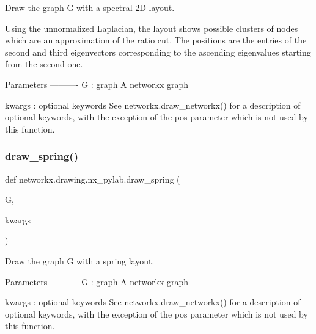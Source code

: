 \begin{DoxyVerb}Draw the graph G with a spectral 2D layout.

Using the unnormalized Laplacian, the layout shows possible clusters of
nodes which are an approximation of the ratio cut. The positions are the
entries of the second and third eigenvectors corresponding to the
ascending eigenvalues starting from the second one.

Parameters
----------
G : graph
    A networkx graph

kwargs : optional keywords
    See networkx.draw_networkx() for a description of optional keywords,
    with the exception of the pos parameter which is not used by this
    function.
\end{DoxyVerb}
 \mbox{\label{namespacenetworkx_1_1drawing_1_1nx__pylab_aac1c6c6cb4283783cd8d9b97c62e3b2d}} 
\subsubsection{\texorpdfstring{draw\+\_\+spring()}{draw\_spring()}}
{\footnotesize\ttfamily def networkx.\+drawing.\+nx\+\_\+pylab.\+draw\+\_\+spring (\begin{DoxyParamCaption}\item[{}]{G,  }\item[{}]{kwargs }\end{DoxyParamCaption})}

\begin{DoxyVerb}Draw the graph G with a spring layout.

Parameters
----------
G : graph
    A networkx graph

kwargs : optional keywords
    See networkx.draw_networkx() for a description of optional keywords,
    with the exception of the pos parameter which is not used by this
    function.
\end{DoxyVerb}
 
